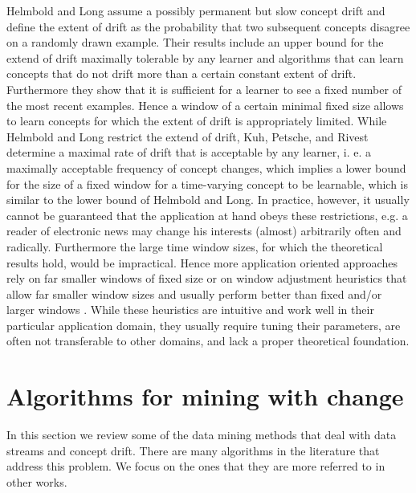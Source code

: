 Helmbold and Long \cite{helmbold94tracking} assume a possibly permanent but slow concept 
drift and define the extent of drift as the probability that two subsequent 
concepts disagree on a randomly drawn example. Their results include an 
upper bound for the extend of drift maximally tolerable by any learner and 
algorithms that can learn concepts that do not drift more than a certain 
constant extent of drift. Furthermore they show that it is sufficient for a 
learner to see a fixed number of the most recent examples. Hence a window 
of a certain minimal fixed size allows to learn concepts for which the extent 
of drift is appropriately limited. 
While Helmbold and Long restrict the extend of drift, Kuh, Petsche, and 
Rivest~\cite{kuh} determine a maximal rate of drift that is acceptable by any learner, 
i. e. a maximally acceptable frequency of concept changes, which implies a 
lower bound for the size of a fixed window for a time-varying concept to be 
learnable, which is similar to the lower bound of Helmbold and Long. 
\ENDOMIT
\BEGINOMIT
In practice, however, it usually cannot be guaranteed that the application 
at hand obeys these restrictions, e.g. a reader of electronic news may change 
his interests (almost) arbitrarily often and radically. Furthermore the large 
time window sizes, for which the theoretical results hold, would be impractical. 
Hence more application oriented approaches rely on far smaller windows 
of fixed size or on window adjustment heuristics that allow far smaller window 
sizes and usually perform better than fixed and/or larger windows . 
While these heuristics are intuitive and work well in their particular application
 domain, they usually require tuning their parameters, are often not 
transferable to other domains, and lack a proper theoretical foundation. 
\ENDOMIT

\section{Algorithms for mining with change}
In this section we review some of the data mining methods that deal with data streams and concept drift. There are many algorithms in the literature that address this problem. We focus on the ones %
that they are more referred to in other works.



